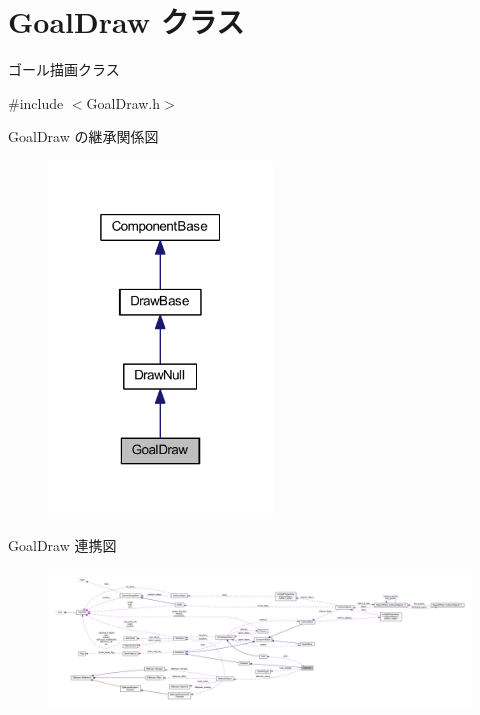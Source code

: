 \hypertarget{class_goal_draw}{}\section{Goal\+Draw クラス}
\label{class_goal_draw}


ゴール描画クラス  




{\ttfamily \#include $<$Goal\+Draw.\+h$>$}



Goal\+Draw の継承関係図\nopagebreak
\begin{figure}[H]
\begin{center}
\leavevmode
\includegraphics[width=169pt]{class_goal_draw__inherit__graph}
\end{center}
\end{figure}


Goal\+Draw 連携図\nopagebreak
\begin{figure}[H]
\begin{center}
\leavevmode
\includegraphics[width=350pt]{class_goal_draw__coll__graph}
\end{center}
\end{figure}
